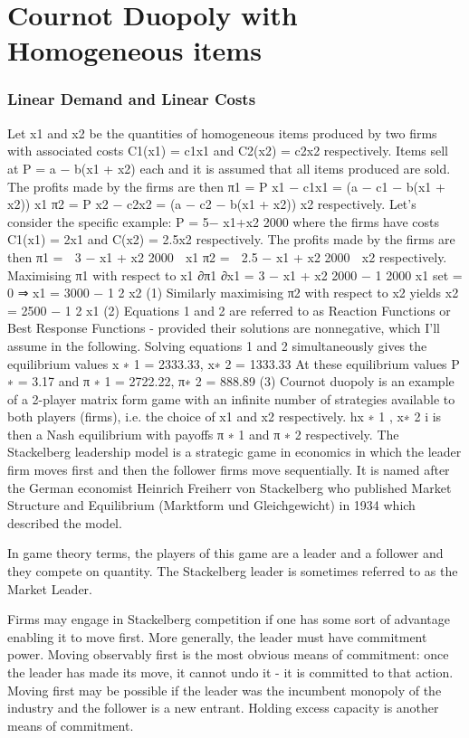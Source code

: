 \section{Cournot Duopoly with Homogeneous items}


\subsubsection{Linear Demand and Linear Costs}

Let x1 and x2 be the quantities of homogeneous items produced by two firms with associated
costs C1(x1) = c1x1 and C2(x2) = c2x2 respectively.
Items sell at P = a − b(x1 + x2) each and it is assumed that all items produced are sold.
The profits made by the firms are then
π1 = P x1 − c1x1 = (a − c1 − b(x1 + x2)) x1
π2 = P x2 − c2x2 = (a − c2 − b(x1 + x2)) x2
respectively.
Let’s consider the specific example: P = 5−
x1+x2
2000 where the firms have costs C1(x1) = 2x1
and C(x2) = 2.5x2 respectively.
The profits made by the firms are then
π1 =

3 −
x1 + x2
2000 
x1
π2 =

2.5 −
x1 + x2
2000 
x2
respectively.
Maximising π1 with respect to x1
∂π1
∂x1
= 3 −
x1 + x2
2000
−
1
2000
x1
set = 0
⇒ x1 = 3000 −
1
2
x2 (1)
Similarly maximising π2 with respect to x2 yields
x2 = 2500 −
1
2
x1 (2)
Equations 1 and 2 are referred to as Reaction Functions or Best Response Functions -
provided their solutions are nonnegative, which I’ll assume in the following.
Solving equations 1 and 2 simultaneously gives the equilibrium values
x
∗
1 = 2333.33, x∗
2 = 1333.33
At these equilibrium values
P
∗ = 3.17
and
π
∗
1 = 2722.22, π∗
2 = 888.89 (3)
Cournot duopoly is an example of a 2-player matrix form game with an infinite number
of strategies available to both players (firms), i.e. the choice of x1 and x2 respectively.
hx
∗
1
, x∗
2
i is then a Nash equilibrium with payoffs π
∗
1
and π
∗
2
respectively.
\newpage
The Stackelberg leadership model is a strategic game in economics in which the leader firm moves first and then the follower firms move sequentially. It is named after the German economist Heinrich Freiherr von Stackelberg who published Market Structure and Equilibrium (Marktform und Gleichgewicht) in 1934 which described the model.

In game theory terms, the players of this game are a leader and a follower and they compete on quantity. The Stackelberg leader is sometimes referred to as the Market Leader.

Firms may engage in Stackelberg competition if one has some sort of advantage enabling it to move first. More generally, the leader must have commitment power. Moving observably first is the most obvious means of commitment: once the leader has made its move, it cannot undo it - it is committed to that action. Moving first may be possible if the leader was the incumbent monopoly of the industry and the follower is a new entrant. Holding excess capacity is another means of commitment.


